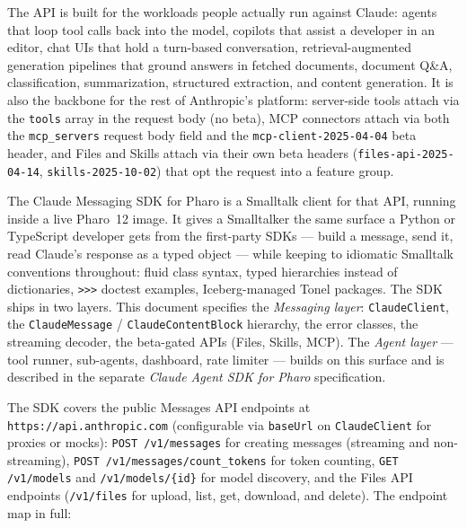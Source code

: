 \documentclass[a4paper,10pt,fleqn]{article}
\begin{document}
The API is built for the workloads people actually run against
Claude: agents that loop tool calls back into the model, copilots
that assist a developer in an editor, chat UIs that hold a
turn-based conversation, retrieval-augmented generation pipelines
that ground answers in fetched documents, document Q\&A,
classification, summarization, structured extraction, and content
generation.  It is also the backbone for the rest of Anthropic's
platform: server-side tools attach via the \texttt{tools} array
in the request body (no beta), MCP connectors attach via both the
\texttt{mcp\_servers} request body field and the
\texttt{mcp-client-2025-04-04} beta header, and Files and Skills
attach via their own beta headers (\texttt{files-api-2025-04-14},
\texttt{skills-2025-10-02}) that opt the request into a feature group.

The Claude Messaging SDK for Pharo is a Smalltalk client for
that API, running inside a live Pharo~12 image.  It
gives a Smalltalker the same surface a Python or TypeScript developer
gets from the first-party SDKs --- build a message, send it, read
Claude's response as a typed object --- while keeping to idiomatic
Smalltalk conventions throughout: fluid class syntax, typed hierarchies
instead of dictionaries, \texttt{>>>} doctest examples, Iceberg-managed
Tonel packages.  The SDK ships in two layers.  This document specifies
the \emph{Messaging layer}: \texttt{ClaudeClient}, the
\texttt{ClaudeMessage} / \texttt{ClaudeContentBlock} hierarchy, the
error classes, the streaming decoder, the beta-gated APIs (Files,
Skills, MCP).  The \emph{Agent layer} --- tool runner, sub-agents,
dashboard, rate limiter --- builds on this surface and is described in
the separate \emph{Claude Agent SDK for Pharo} specification.

The SDK covers the public Messages API endpoints at
\texttt{https://api.anthropic.com} (configurable via \texttt{baseUrl}
on \texttt{ClaudeClient} for proxies or mocks): \texttt{POST
/v1/messages} for creating messages (streaming and non-streaming),
\texttt{POST /v1/messages/count\_tokens} for token counting,
\texttt{GET /v1/models} and \texttt{/v1/models/\{id\}} for model
discovery, and the Files API endpoints (\texttt{/v1/files} for upload,
list, get, download, and delete).  The endpoint map in full:
\end{document}
